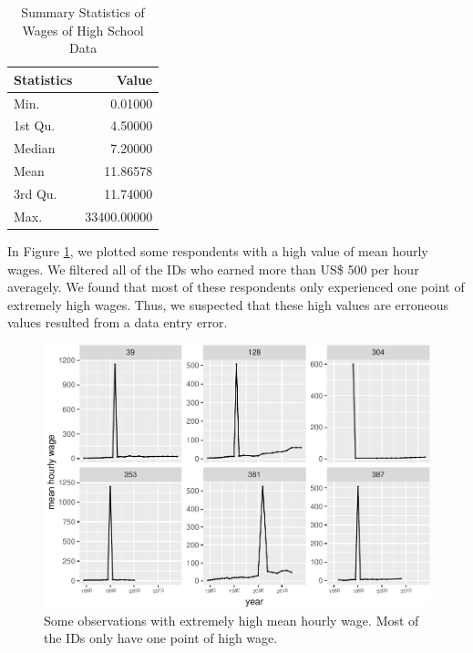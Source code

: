 \begin{Schunk}
\begin{table}

\caption{\label{tab:summarytable}Summary Statistics of Wages of High School Data}
\centering
\begin{tabular}[t]{l|r}
\hline
Statistics & Value\\
\hline
\rowcolor{gray!6}  Min. & 0.01000\\
\hline
1st Qu. & 4.50000\\
\hline
\rowcolor{gray!6}  Median & 7.20000\\
\hline
Mean & 11.86578\\
\hline
\rowcolor{gray!6}  3rd Qu. & 11.74000\\
\hline
Max. & 33400.00000\\
\hline
\end{tabular}
\end{table}

\end{Schunk}

In Figure \ref{fig:high-wages}, we plotted some respondents with a high
value of mean hourly wages. We filtered all of the IDs who earned more
than US\$ 500 per hour averagely. We found that most of these
respondents only experienced one point of extremely high wages. Thus, we
suspected that these high values are erroneous values resulted from a
data entry error.

\begin{Schunk}
\begin{figure}
\includegraphics{figures/high-wages-1} \caption[Some observations with extremely high mean hourly wage]{Some observations with extremely high mean hourly wage. Most of the IDs only have one point of high wage.}\label{fig:high-wages}
\end{figure}
\end{Schunk}

